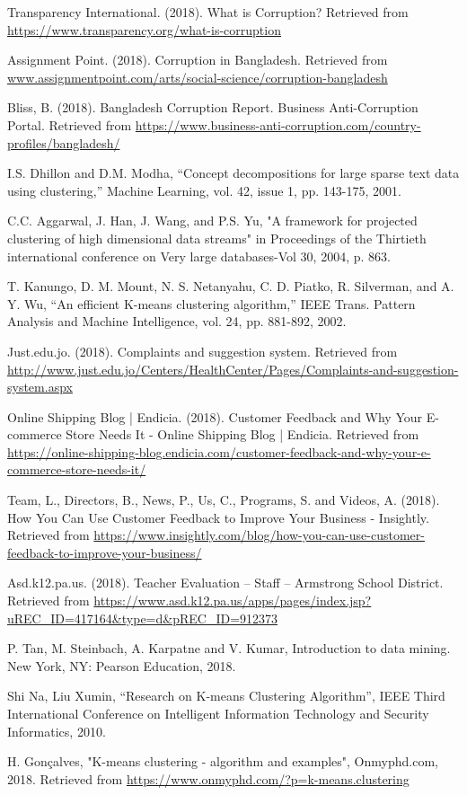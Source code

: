 \documentclass[conference]{IEEEtran}
\begin{document}
\begin{thebibliography}{99}

Transparency International. (2018). What is Corruption? Retrieved from \url{https://www.transparency.org/what-is-corruption}

Assignment Point. (2018). Corruption in Bangladesh. Retrieved from \url{www.assignmentpoint.com/arts/social-science/corruption-bangladesh}

Bliss, B. (2018). Bangladesh Corruption Report. Business Anti-Corruption Portal. Retrieved from \url{https://www.business-anti-corruption.com/country-profiles/bangladesh/}

I.S. Dhillon and D.M. Modha, “Concept decompositions for large sparse text data using clustering,” Machine Learning, vol. 42, issue 1, pp. 143-175, 2001.

C.C. Aggarwal, J. Han, J. Wang, and P.S. Yu, "A framework for projected clustering of high dimensional data streams" in Proceedings of the Thirtieth international conference on Very large databases-Vol 30, 2004, p. 863.

T. Kanungo, D. M. Mount, N. S. Netanyahu, C. D. Piatko, R. Silverman, and A. Y. Wu, “An efficient K-means clustering algorithm,” IEEE Trans. Pattern Analysis and Machine Intelligence, vol. 24, pp. 881-892, 2002.

Just.edu.jo. (2018). Complaints and suggestion system. Retrieved from \url{http://www.just.edu.jo/Centers/HealthCenter/Pages/Complaints-and-suggestion-system.aspx}

\vspace{350pt}

Online Shipping Blog | Endicia. (2018). Customer Feedback and Why Your E-commerce Store Needs It - Online Shipping Blog | Endicia. Retrieved from \url{https://online-shipping-blog.endicia.com/customer-feedback-and-why-your-e-commerce-store-needs-it/}

Team, L., Directors, B., News, P., Us, C., Programs, S. and Videos, A. (2018). How You Can Use Customer Feedback to Improve Your Business - Insightly. Retrieved from \url{https://www.insightly.com/blog/how-you-can-use-customer-feedback-to-improve-your-business/}

Asd.k12.pa.us. (2018). Teacher Evaluation – Staff – Armstrong School District. Retrieved from \url{https://www.asd.k12.pa.us/apps/pages/index.jsp?uREC_ID=417164&type=d&pREC_ID=912373}

P. Tan, M. Steinbach, A. Karpatne and V. Kumar, Introduction to data mining. New York, NY: Pearson Education, 2018.

Shi Na, Liu Xumin, “Research on K-means Clustering Algorithm”, IEEE Third International Conference on Intelligent Information Technology and Security Informatics, 2010.

H. Gonçalves, "K-means clustering - algorithm and examples", Onmyphd.com, 2018. Retrieved from \url{https://www.onmyphd.com/?p=k-means.clustering}

\end{thebibliography}
\end{document}
